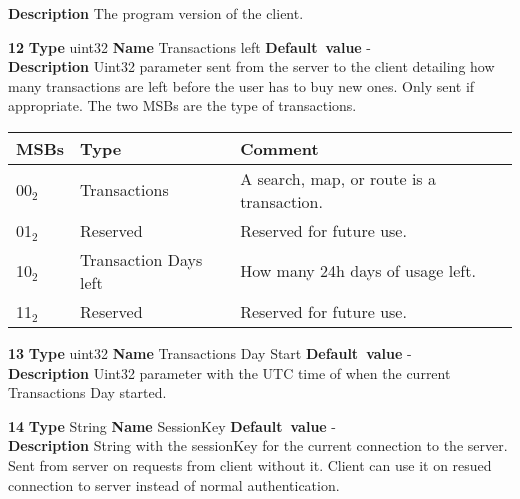 \begin{list}{\textbf{ParamID}}{}
  \label{Program version}
  \textbf{Description} The program version of the client.
\item \textbf{12} \textbf{Type} uint32 \textbf{Name} Transactions left 
                 \textbf{Default~value} - \\
  \textbf{Description} Uint32 parameter sent from the server to the client 
  detailing how many transactions are left before the user has to buy new ones.
  Only sent if appropriate.
  The two MSBs are the type of transactions.
  \begin{table}[hbt]
    \begin{center}
      \begin{tabular}{|l|l|l|}
        \hline
        MSBs   & Type              & Comment \\\hline
        00$_2$ & Transactions      & A search, map, or route is a transaction.
                                     \\\hline
        01$_2$ & Reserved          & Reserved for future use. \\\hline
        10$_2$ & Transaction Days left & How many 24h days of usage left. 
                                         \\\hline
        11$_2$ & Reserved          & Reserved for future use.  \\\hline
      \end{tabular}
    \end{center}
  \end{table}
\item \textbf{13} \textbf{Type} uint32 \textbf{Name} Transactions Day Start
                 \textbf{Default~value} - \\
  \textbf{Description} Uint32 parameter with the UTC time of when the 
  current Transactions Day started.
\item \textbf{14} \textbf{Type} String \textbf{Name} SessionKey
                 \textbf{Default~value} - \\
  \textbf{Description} String with the sessionKey for the current connection to
  the server. Sent from server on requests from client without it. Client can
  use it on resued connection to server instead of normal authentication.


\end{list}
